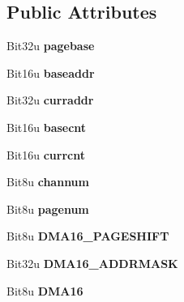 \subsection*{Public Attributes}
\begin{DoxyCompactItemize}
\item 
\hypertarget{classDmaChannel_ab476f51a0e1647c534237be6d9107bb9}{Bit32u {\bfseries pagebase}}\label{classDmaChannel_ab476f51a0e1647c534237be6d9107bb9}

\item 
\hypertarget{classDmaChannel_adb8962b7638b278f5b54d3e66660b7eb}{Bit16u {\bfseries baseaddr}}\label{classDmaChannel_adb8962b7638b278f5b54d3e66660b7eb}

\item 
\hypertarget{classDmaChannel_a0f211edc1f671024dac378f34f7b2473}{Bit32u {\bfseries curraddr}}\label{classDmaChannel_a0f211edc1f671024dac378f34f7b2473}

\item 
\hypertarget{classDmaChannel_a5db1cbb8bec606d5ea4df09d21d20662}{Bit16u {\bfseries basecnt}}\label{classDmaChannel_a5db1cbb8bec606d5ea4df09d21d20662}

\item 
\hypertarget{classDmaChannel_a4b8df3d1f00fea6b76a9d9c7a25ba5b1}{Bit16u {\bfseries currcnt}}\label{classDmaChannel_a4b8df3d1f00fea6b76a9d9c7a25ba5b1}

\item 
\hypertarget{classDmaChannel_a65717e5eee75ff4c76038d5b2b0d5014}{Bit8u {\bfseries channum}}\label{classDmaChannel_a65717e5eee75ff4c76038d5b2b0d5014}

\item 
\hypertarget{classDmaChannel_ab1e9f674f8792cd964b67bb4242ca238}{Bit8u {\bfseries pagenum}}\label{classDmaChannel_ab1e9f674f8792cd964b67bb4242ca238}

\item 
\hypertarget{classDmaChannel_a38f9cfa502921c1ae0953aa5c00c44fe}{Bit8u {\bfseries D\-M\-A16\-\_\-\-P\-A\-G\-E\-S\-H\-I\-F\-T}}\label{classDmaChannel_a38f9cfa502921c1ae0953aa5c00c44fe}

\item 
\hypertarget{classDmaChannel_aa279a455a108f21791d84810db3c9d27}{Bit32u {\bfseries D\-M\-A16\-\_\-\-A\-D\-D\-R\-M\-A\-S\-K}}\label{classDmaChannel_aa279a455a108f21791d84810db3c9d27}

\item 
\hypertarget{classDmaChannel_ad662efc766a89ba91872c62d4b075a7c}{Bit8u {\bfseries D\-M\-A16}}\label{classDmaChannel_ad662efc766a89ba91872c62d4b075a7c}


\end{DoxyCompactItemize}
